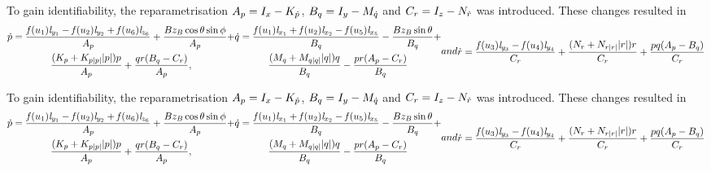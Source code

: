 \documentclass[11pt]{beamer}
\begin{document}
\begin{frame}[shrink]
To gain identifiability, the reparametrisation $A_p = I_{x} - K_{\dot{p}}$, $B_q = I_{y} - M_{\dot{q}}$ and $C_r = I_{z} - N_{\dot{r}}$ was introduced. These changes resulted in
\begin{subequations}\label{eq:quatModel}
\begin{multline} \label{eq:p_dotWithoutTranslation}
\pdot = \frac{\thrusterfun{1} \distance{y}{1} - \thrusterfun{2} \distance{y}{2} + \thrusterfun{6} \distance{z}{6}}{A_p} + \frac{B z_B \cos{\theta} \sin{\phi}}{A_p} + \\ \frac{(\Kp + \Kpabsp \abs{p})p}{A_p} + \frac{q r (B_q - C_r)}{A_p},
\end{multline}
\begin{multline} \label{eq:q_dotWithoutTranslation}
\qdot = \frac{\thrusterfun{1} \distance{x}{1} + \thrusterfun{2} \distance{x}{2} - \thrusterfun{5} \distance{x}{5}}{B_q} - \frac{B z_B \sin{\theta}}{B_q} + \\ \frac{(\Mq + \Mqabsq \abs{q})q}{B_q} - \frac{p r (A_p - C_r)}{B_q}
\end{multline}
and
\begin{multline} \label{eq:r_dotWithoutTranslation}
\rdot = \frac{\thrusterfun{3} \distance{y}{3} - \thrusterfun{4} \distance{y}{4}}{C_r} + \frac{(\Nr + \Nrabsr \abs{r})r}{C_r} + \frac{p q (A_p  - B_q)}{C_r}
\end{multline}
\end{subequations}
\end{frame}
\begin{frame}[shrink]
To gain identifiability, the reparametrisation $A_p = I_{x} - K_{\dot{p}}$, $B_q = I_{y} - M_{\dot{q}}$ and $C_r = I_{z} - N_{\dot{r}}$ was introduced. These changes resulted in
\begin{subequations}\label{eq:quatModel}
\begin{multline} \label{eq:p_dotWithoutTranslation}
\pdot = \frac{\thrusterfun{1} \distance{y}{1} - \thrusterfun{2} \distance{y}{2} + \thrusterfun{6} \distance{z}{6}}{A_p} + \frac{B z_B \cos{\theta} \sin{\phi}}{A_p} + \\ \frac{(\Kp + \Kpabsp \abs{p})p}{A_p} + \frac{q r (B_q - C_r)}{A_p},
\end{multline}
\begin{multline} \label{eq:q_dotWithoutTranslation}
\qdot = \frac{\thrusterfun{1} \distance{x}{1} + \thrusterfun{2} \distance{x}{2} - \thrusterfun{5} \distance{x}{5}}{B_q} - \frac{B z_B \sin{\theta}}{B_q} + \\ \frac{(\Mq + \Mqabsq \abs{q})q}{B_q} - \frac{p r (A_p - C_r)}{B_q}
\end{multline}
and
\begin{multline} \label{eq:r_dotWithoutTranslation}
\rdot = \frac{\thrusterfun{3} \distance{y}{3} - \thrusterfun{4} \distance{y}{4}}{C_r} + \frac{(\Nr + \Nrabsr \abs{r})r}{C_r} + \frac{p q (A_p  - B_q)}{C_r}
\end{multline}
\end{subequations}
\end{frame}
\end{document}
